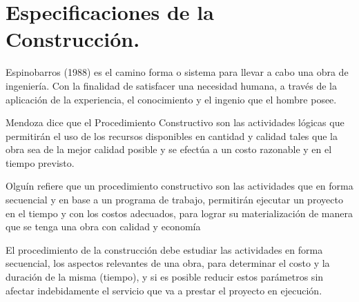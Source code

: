 \section{Especificaciones de la Construcción.}
Espinobarros (1988) es el camino forma o sistema para llevar a cabo una obra de ingeniería. Con la finalidad de satisfacer una necesidad humana, a través de la aplicación de la experiencia, el conocimiento y el ingenio que el hombre posee.

Mendoza dice que el Procedimiento Constructivo son las actividades lógicas que permitirán el uso de los recursos disponibles en cantidad y calidad tales que la obra sea de la mejor calidad posible y se efectúa a un costo razonable y en el tiempo previsto.

Olguín refiere que un procedimiento constructivo son las actividades que en forma secuencial y en base a un programa de trabajo, permitirán ejecutar un proyecto en el tiempo y con los costos adecuados, para lograr su materialización de manera que se tenga una obra con calidad y economía

El procedimiento de la construcción debe estudiar las actividades en forma secuencial, los aspectos relevantes de una obra, para determinar el costo y la duración de la misma (tiempo), y si es posible reducir estos parámetros sin afectar indebidamente el servicio que va a prestar el proyecto en ejecución.

